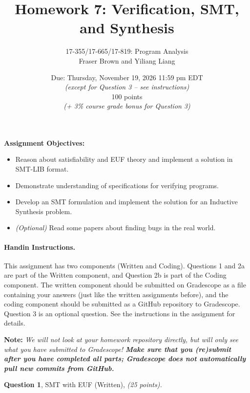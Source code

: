 \documentclass[11pt]{article}
\title{Homework 7: Verification, SMT, and Synthesis}
\author{17-355/17-665/17-819: Program Analysis\\
        Fraser Brown and Yiliang Liang}
\date{Due: Thursday, November 19, 2026 11:59 pm EDT \\
\emph{(except for Question 3 -- see instructions)} \\[1em]
100 points \\
\emph{(+ 3\% course grade bonus for Question 3)}
}
\newcommand{\question}[3]
  {\bigskip \noindent
  {\bf Question #1}, {#2}, {\it(#3 points).}}
\begin{document}
\newtheorem{theorem}{Theorem}
\newtheorem{lemma}[theorem]{Lemma}

\newcommand{\pfalse}{\mbox{false}}
\newcommand{\ptrue}{\mbox{true}}
\newcommand{\pand}{\mbox{and}}
\newcommand{\por}{\mbox{or}}
\newcommand{\pskip}{\mbox{skip}}
\newcommand{\pif}{\mbox{if}}
\newcommand{\pthen}{\mbox{then}}
\newcommand{\pelse}{\mbox{else}}
\newcommand{\pdo}{\mbox{do}}
\newcommand{\pwhile}{\mbox{while}}


\maketitle

\vspace{1ex}\noindent\textbf{Assignment Objectives:}

\begin{itemize}[labelwidth=0.7em, labelsep=0.6em, topsep=0ex, itemsep=0ex,
  parsep=0ex, leftmargin=1.0em]
\item Reason about satisfiability and EUF theory and implement a solution in SMT-LIB format.
\item Demonstrate understanding of specifications for verifying programs.
\item Develop an SMT formulation and implement the solution for an Inductive
  Synthesis problem.
\item \emph{(Optional)} Read some papers about finding bugs in the real world.
\end{itemize}

\paragraph{Handin Instructions.} This assignment has two components (Written and Coding). Questions 1 and 2a are part of the Written component, and Question 2b is part of the Coding component. The written component should be submitted on Gradescope as a file containing your answers (just like the written assignments before), and the coding component should be submitted as a GitHub repository to Gradescope. Question 3 is an optional question. See the instructions in the assignment for details.

\textbf{Note:} \emph{We will not look at your homework repository directly, but
  will only see what you have submitted to Gradescope! \textbf{Make sure that
    you (re)submit after you have completed all parts; Gradescope does not
    automatically pull new commits from GitHub.}}

\question{1}{SMT with EUF (Written)}{25}
\end{document}
